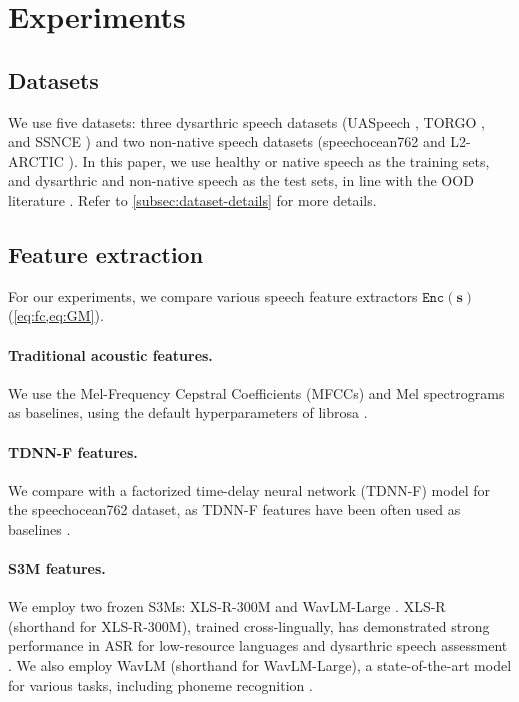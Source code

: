 \section{Experiments}\label{sec:exp}
\subsection{Datasets}\label{subsec:datasets}
We use five datasets: three dysarthric speech datasets (UASpeech \citep{kim2008dysarthric}, TORGO \citep{rudzicz2012torgo}, and SSNCE \citep{ta2016dysarthric}) and two non-native speech datasets (speechocean762 \citep{speechocean762} and L2-ARCTIC \citep{zhao2018l2}).
In this paper, we use healthy or native speech as the training sets, and dysarthric and non-native speech as the test sets, in line with the OOD literature \citep{DBLP:conf/iclr/HendrycksG17}. 
Refer to \autoref{subsec:dataset-details} for more details.


\subsection{Feature extraction}\label{subsec:features}
For our experiments, we compare various speech feature extractors $\texttt{Enc}(\mathbf{s})$  (\cref{eq:fc,eq:GM}).


\paragraph{Traditional acoustic features.}
We use the Mel-Frequency Cepstral Coefficients (MFCCs) and Mel spectrograms as baselines, using the default hyperparameters of librosa \citep{mcfee2015librosa}.


\paragraph{TDNN-F features.}
We compare with a factorized time-delay neural network (TDNN-F) model \citep{povey2018semi} for the speechocean762 dataset, as TDNN-F features have been often used as baselines \citep{speechocean762,gong2022transformer,chao20223m,do2023hierarchical}.


\paragraph{S3M features.}
We employ two frozen S3Ms: XLS-R-300M \citep{babu22_interspeech} and WavLM-Large \citep{chen2022wavlm}. 
XLS-R (shorthand for XLS-R-300M), trained cross-lingually, has demonstrated strong performance in ASR for low-resource languages \citep{babu22_interspeech} and dysarthric speech assessment \citep{yeo23_interspeech}. 
We also employ WavLM (shorthand for WavLM-Large), a state-of-the-art model for various tasks, including phoneme recognition \citep{feng2023superb,yang21c_interspeech}.


